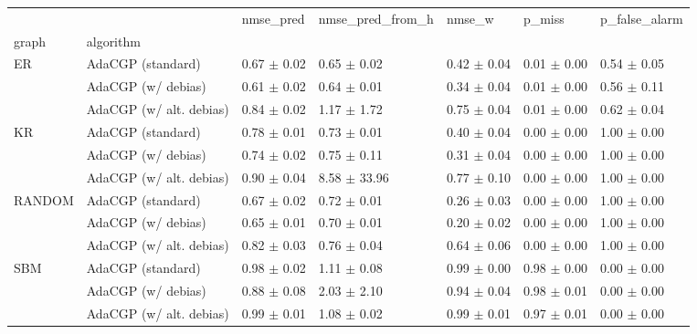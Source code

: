 \begin{tabular}{lllllll}
\toprule
    &                         &        nmse_pred &  nmse_pred_from_h &           nmse_w &           p_miss &    p_false_alarm \\
graph & algorithm &                  &                   &                  &                  &                  \\
\midrule
ER & AdaCGP (standard) &  0.67 $\pm$ 0.02 &   0.65 $\pm$ 0.02 &  0.42 $\pm$ 0.04 &  0.01 $\pm$ 0.00 &  0.54 $\pm$ 0.05 \\
    & AdaCGP (w/ debias) &  0.61 $\pm$ 0.02 &   0.64 $\pm$ 0.01 &  0.34 $\pm$ 0.04 &  0.01 $\pm$ 0.00 &  0.56 $\pm$ 0.11 \\
    & AdaCGP (w/ alt. debias) &  0.84 $\pm$ 0.02 &   1.17 $\pm$ 1.72 &  0.75 $\pm$ 0.04 &  0.01 $\pm$ 0.00 &  0.62 $\pm$ 0.04 \\
KR & AdaCGP (standard) &  0.78 $\pm$ 0.01 &   0.73 $\pm$ 0.01 &  0.40 $\pm$ 0.04 &  0.00 $\pm$ 0.00 &  1.00 $\pm$ 0.00 \\
    & AdaCGP (w/ debias) &  0.74 $\pm$ 0.02 &   0.75 $\pm$ 0.11 &  0.31 $\pm$ 0.04 &  0.00 $\pm$ 0.00 &  1.00 $\pm$ 0.00 \\
    & AdaCGP (w/ alt. debias) &  0.90 $\pm$ 0.04 &  8.58 $\pm$ 33.96 &  0.77 $\pm$ 0.10 &  0.00 $\pm$ 0.00 &  1.00 $\pm$ 0.00 \\
RANDOM & AdaCGP (standard) &  0.67 $\pm$ 0.02 &   0.72 $\pm$ 0.01 &  0.26 $\pm$ 0.03 &  0.00 $\pm$ 0.00 &  1.00 $\pm$ 0.00 \\
    & AdaCGP (w/ debias) &  0.65 $\pm$ 0.01 &   0.70 $\pm$ 0.01 &  0.20 $\pm$ 0.02 &  0.00 $\pm$ 0.00 &  1.00 $\pm$ 0.00 \\
    & AdaCGP (w/ alt. debias) &  0.82 $\pm$ 0.03 &   0.76 $\pm$ 0.04 &  0.64 $\pm$ 0.06 &  0.00 $\pm$ 0.00 &  1.00 $\pm$ 0.00 \\
SBM & AdaCGP (standard) &  0.98 $\pm$ 0.02 &   1.11 $\pm$ 0.08 &  0.99 $\pm$ 0.00 &  0.98 $\pm$ 0.00 &  0.00 $\pm$ 0.00 \\
    & AdaCGP (w/ debias) &  0.88 $\pm$ 0.08 &   2.03 $\pm$ 2.10 &  0.94 $\pm$ 0.04 &  0.98 $\pm$ 0.01 &  0.00 $\pm$ 0.00 \\
    & AdaCGP (w/ alt. debias) &  0.99 $\pm$ 0.01 &   1.08 $\pm$ 0.02 &  0.99 $\pm$ 0.01 &  0.97 $\pm$ 0.01 &  0.00 $\pm$ 0.00 \\
\bottomrule
\end{tabular}
